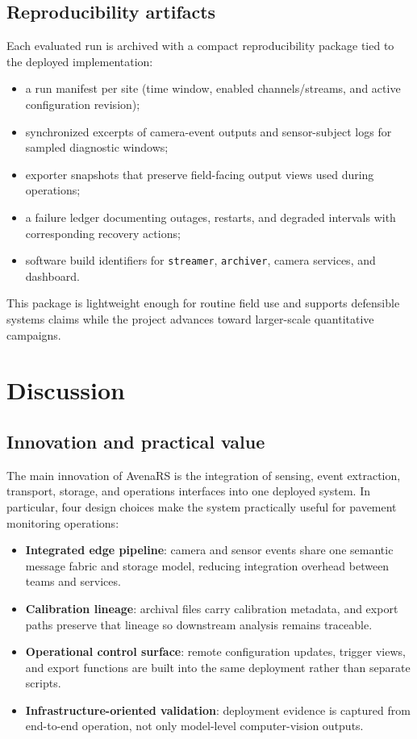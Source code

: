 \documentclass[conference]{IEEEtran}
\begin{document}
\subsection{Reproducibility artifacts}
Each evaluated run is archived with a compact reproducibility package tied to the deployed implementation:
\begin{itemize}
\item a run manifest per site (time window, enabled channels/streams, and active configuration revision);
\item synchronized excerpts of camera-event outputs and sensor-subject logs for sampled diagnostic windows;
\item exporter snapshots that preserve field-facing output views used during operations;
\item a failure ledger documenting outages, restarts, and degraded intervals with corresponding recovery actions;
\item software build identifiers for \texttt{streamer}, \texttt{archiver}, camera services, and dashboard.
\end{itemize}

This package is lightweight enough for routine field use and supports defensible systems claims while the project advances toward larger-scale quantitative campaigns.

\section{Discussion}
\subsection{Innovation and practical value}
The main innovation of AvenaRS is the integration of sensing, event extraction, transport, storage, and operations interfaces into one deployed system. In particular, four design choices make the system practically useful for pavement monitoring operations:
\begin{itemize}
\item \textbf{Integrated edge pipeline}: camera and sensor events share one semantic message fabric and storage model, reducing integration overhead between teams and services.
\item \textbf{Calibration lineage}: archival files carry calibration metadata, and export paths preserve that lineage so downstream analysis remains traceable.
\item \textbf{Operational control surface}: remote configuration updates, trigger views, and export functions are built into the same deployment rather than separate scripts.
\item \textbf{Infrastructure-oriented validation}: deployment evidence is captured from end-to-end operation, not only model-level computer-vision outputs.
\end{itemize}
\end{document}
